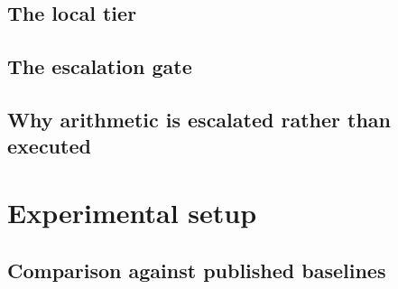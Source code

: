 \documentclass[11pt]{article}
\begin{document}
\subsection{The local tier}

\subsection{The escalation gate}

\subsection{Why arithmetic is escalated rather than executed}

\section{Experimental setup}
\label{sec:long-setup}


\subsection{Comparison against published baselines}
\label{sec:long-baselines}

%
\end{document}
